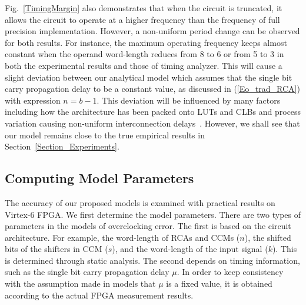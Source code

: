 \documentclass[journal]{IEEEtran}
\begin{document}
Fig.~\ref{TimingMargin} also demonstrates that when the circuit is truncated, it allows the circuit to operate at a higher frequency than the frequency of full precision implementation. However, a non-uniform period change can be observed for both results. For instance, the maximum operating frequency keeps almost constant when the operand word-length reduces from 8 to 6 or from 5 to 3 in both the experimental results and those of timing analyzer. This will cause a slight deviation between our analytical model which assumes that the single bit carry propagation delay to be a constant value, as discussed in (\ref{Eo_trad_RCA}) with expression $n=b-1$. This deviation will be influenced by many factors including how the architecture has been packed onto LUTs and CLBs and process variation causing non-uniform interconnection delays~\cite{FPGAPV}. However, we shall see that our model remains close to the true empirical results in Section~\ref{Section_Experiments}.




\subsection{Computing Model Parameters}
The accuracy of our proposed models is examined with practical results on Virtex-6 FPGA. We first determine the model parameters. There are two types of parameters in the models of overclocking error. The first is based on the circuit architecture. For example, the word-length of RCAs and CCMs ($n$), the shifted bits of the shifters in CCM ($s$), and the word-length of the input signal ($k$). This is determined through static analysis. The second depends on timing information, such as the single bit carry propagation delay $\mu$. In order to keep consistency with the assumption made in models that $\mu$ is a fixed value, it is obtained according to the actual FPGA measurement results.
\end{document}
